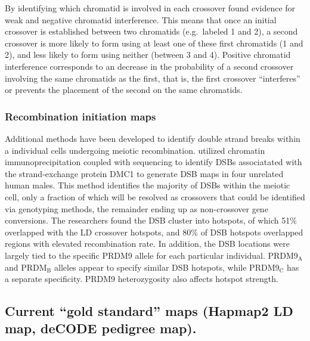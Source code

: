 By identifying which chromatid is involved in each crossover \citet{Hou2013} found evidence for weak and negative chromatid interference.
This means that once an initial crossover is established between two chromatids (e.g.\ labeled 1 and 2), a second crossover is more likely to form using at least one of these first chromatids (1 and 2), and less likely to form using neither (between 3 and 4).
Positive chromatid interference corresponds to an decrease in the probability of a second crossover involving the same chromatids as the first, that is, the first crossover ``interferes'' or prevents the placement of the second on the same chromatids.





\subsubsection{Recombination initiation maps}
Additional methods have been developed to identify double strand breaks within a individual cells undergoing meiotic recombination.
\citet{Pratto2014} utilized chromatin immunoprecipitation coupled with sequencing to identify DSBs associatated with the strand-exchange protein DMC1 to generate DSB maps in four unrelated human males.
This method identifies the majority of DSBs within the meiotic cell, only a fraction of which will be resolved as crossovers that could be identified via genotyping methods, the remainder ending up as non-crossover gene conversions.
The researchers found the DSB cluster into hotspots, of which 51\% overlapped with the LD crossover hotspots\cite{hapmap2007}, and 80\% of DSB hotspots overlapped regions with elevated recombination rate.
In addition, the DSB locations were largely tied to the specific PRDM9 allele for each particular individual.
PRDM9$_\text{A}$ and PRDM$_\text{B}$ alleles appear to specify similar DSB hotspots, while PRDM9$_\text{C}$ has a separate specificity.
PRDM9 heterozygosity also affects hotspot strength.

\subsection{Current ``gold standard'' maps (Hapmap2 LD map, deCODE pedigree map).}

